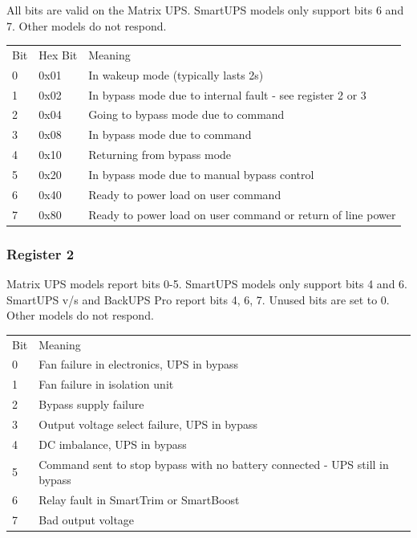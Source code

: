 {{{{{{{{{{{{{{{{{All bits are valid on the Matrix UPS. SmartUPS models only support bits 6 and
7. Other models do not respond.  

\begin{longtable}{lll}
{Bit} & {Hex Bit} & {Meaning 
 } \\
{0} & {0x01} & {In wakeup mode (typically lasts \lt{} 2s) 
 } \\
{1} & {0x02} & {In bypass mode due to internal fault - see register 2 or 3 
 } \\
{2} & {0x04} & {Going to bypass mode due to command 
 } \\
{3} & {0x08} & {In bypass mode due to command 
 } \\
{4} & {0x10} & {Returning from bypass mode 
 } \\
{5} & {0x20} & {In bypass mode due to manual bypass control 
 } \\
{6} & {0x40} & {Ready to power load on user command 
 } \\
{7} & {0x80} & {Ready to power load on user command or return of line power  
}

\end{longtable}

\label{Register-2}

\subsubsection*{Register 2}

Matrix UPS models report bits 0-5. SmartUPS models only support bits 4 and 6.
SmartUPS v/s and BackUPS Pro report bits 4, 6, 7. Unused bits are set to 0.
Other models do not respond.  

\begin{longtable}{ll}
{Bit} & {Meaning 
 } \\
{0} & {Fan failure in electronics, UPS in bypass 
 } \\
{1} & {Fan failure in isolation unit 
 } \\
{2} & {Bypass supply failure 
 } \\
{3} & {Output voltage select failure, UPS in bypass 
 } \\
{4} & {DC imbalance, UPS in bypass 
 } \\
{5} & {Command sent to stop bypass with no battery connected - UPS still in
bypass 
 } \\
{6} & {Relay fault in SmartTrim or SmartBoost 
 } \\
{7} & {Bad output voltage  
}


\end{longtable}}}}}}}}}}}}}}}}}}

